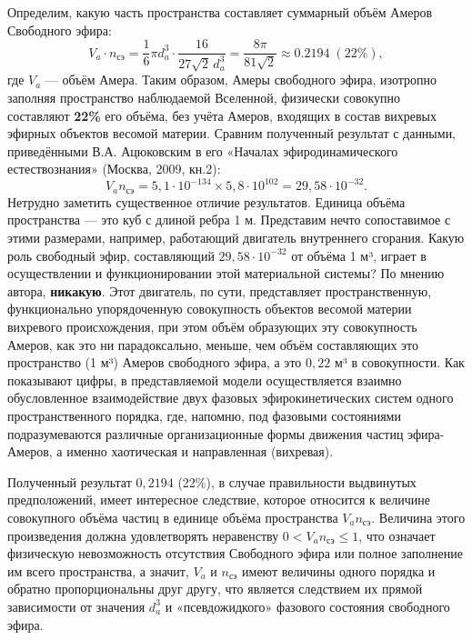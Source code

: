 Определим, какую часть пространства составляет суммарный объём Амеров Свободного эфира:
\[
V_a \cdot n_{\text{сэ}} = \frac{1}{6}\pi d_a^3 \cdot \frac{16}{27\sqrt{2}\,d_a^3} = \frac{8\pi}{81\sqrt{2}} \approx 0.2194 \; (22\%),
\]
где \(V_a\) — объём Амера. Таким образом, Амеры свободного эфира, изотропно заполняя пространство наблюдаемой Вселенной, физически совокупно составляют \textbf{22\%} его объёма, без учёта Амеров, входящих в состав вихревых эфирных объектов весомой материи. Сравним полученный результат с данными, приведёнными В.А. Ацюковским в его «Началах эфиродинамического естествознания» (Москва, 2009, кн.2):
\[
V_a n_{\text{сэ}} = 5,1\cdot10^{-134} \times 5,8\cdot10^{102} = 29,58\cdot10^{-32}.
\]
Нетрудно заметить существенное отличие результатов. Единица объёма пространства — это куб с длиной ребра 1 м. Представим нечто сопоставимое с этими размерами, например, работающий двигатель внутреннего сгорания. Какую роль свободный эфир, составляющий \(29,58\cdot10^{-32}\) от объёма 1 м³, играет в осуществлении и функционировании этой материальной системы? По мнению автора, \textbf{никакую}. Этот двигатель, по сути, представляет пространственную, функционально упорядоченную совокупность объектов весомой материи вихревого происхождения, при этом объём образующих эту совокупность Амеров, как это ни парадоксально, меньше, чем объём составляющих это пространство (1 м³) Амеров свободного эфира, а это \(0,22\) м³ в совокупности. Как показывают цифры, в представляемой модели осуществляется взаимно обусловленное взаимодействие двух фазовых эфирокинетических систем одного пространственного порядка, где, напомню, под фазовыми состояниями подразумеваются различные организационные формы движения частиц эфира-Амеров, а именно хаотическая и направленная (вихревая).

Полученный результат \(0,2194\) (22\%), в случае правильности выдвинутых предположений, имеет интересное следствие, которое относится к величине совокупного объёма частиц в единице объёма пространства \(V_a n_{\text{сэ}}\). Величина этого произведения должна удовлетворять неравенству \(0 < V_a n_{\text{сэ}} \le 1\), что означает физическую невозможность отсутствия Свободного эфира или полное заполнение им всего пространства, а значит, \(V_a\) и \(n_{\text{сэ}}\) имеют величины одного порядка и обратно пропорциональны друг другу, что является следствием их прямой зависимости от значения \(d_a^3\) и «псевдожидкого» фазового состояния свободного эфира.
